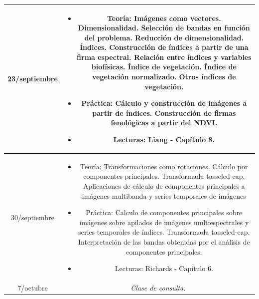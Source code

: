 \documentclass[11pt]{article}
\begin{document}
\begin{longtable}[h!]{| c | c | }
\midrule
23/septiembre & \begin{minipage}{.65\textwidth}
\begin{itemize} 
    \vspace{1mm}
	\item Teoría: Imágenes como vectores. Dimensionalidad. Selección de bandas en función del problema. Reducción de dimensionalidad. Índices. Construcción de índices a partir de una firma espectral. Relación entre índices y variables biofísicas. Índice de vegetación. Índice de vegetación normalizado. Otros índices de vegetación.
  \item Práctica: Cálculo y construcción de imágenes a partir de índices. Construcción de firmas fenológicas a partir del NDVI.
	\item Lecturas: Liang - Capítulo 8.
    \vspace{1mm}
\end{itemize}
\end{minipage} \\


\midrule
30/septiembre & \begin{minipage}{.65\textwidth}
\begin{itemize} 
    \vspace{1mm}
	\item Teoría: Transformaciones como rotaciones. Cálculo por componentes principales. Transformada tasseled-cap. Aplicaciones de cálculo de componentes principales a imágenes multibanda y series temporales de imágenes
  \item Práctica: Calculo de componentes principales sobre imágenes sobre apilados de imágenes multiespectrales y series temporales de índices. Transformada tasseled-cap. Interpretación de las bandas obtenidas por el análisis de componentes principales.
	\item Lecturas: Richards - Capítulo 6. 
    \vspace{1mm}
\end{itemize}
\end{minipage} \\

\midrule
7/octubre & \begin{minipage}{.65\textwidth}
    \vspace{1mm}
\emph{Clase de consulta.}
    \vspace{1mm}
\end{minipage} \\


\end{longtable}
\end{document}
